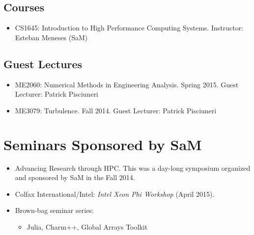 \subsection*{Courses}
\begin{itemize}
    \item CS1645: Introduction to High Performance Computing Systems.  Instructor: Esteban Meneses (SaM)
\end{itemize}

\subsection*{Guest Lectures}
\begin{itemize}
    \item ME2060: Numerical Methods in Engineering Analysis.  Spring 2015.
          Guest Lecturer: Patrick Pisciuneri
    \item ME3079: Turbulence.  Fall 2014.
          Guest Lecturer: Patrick Pisciuneri

\end{itemize}

\section{Seminars Sponsored by SaM }
\begin{itemize}
    \item Advancing Research through HPC.  This was a day-long symposium
          organized and sponsored by SaM in the Fall 2014.
    \item Colfax International/Intel: \textit{Intel Xeon Phi Workshop} (April 2015).
    \item Brown-bag seminar series:
    \begin{itemize}
        \item Julia, Charm++, Global Arrays Toolkit
    \end{itemize}
\end{itemize}
